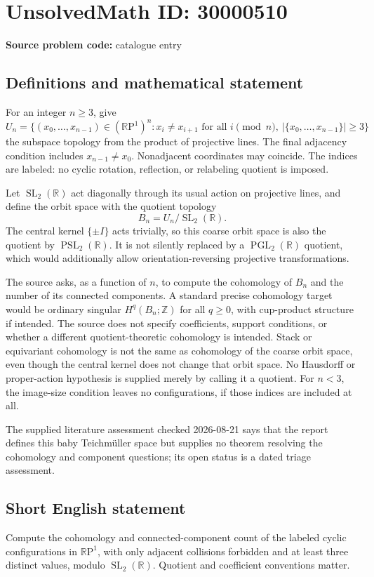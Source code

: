\documentclass[11pt]{article}
\newcommand{\Z}{\mathbb{Z}}
\newcommand{\R}{\mathbb{R}}
\begin{document}
\section*{UnsolvedMath ID: 30000510}
\textbf{Source problem code:} catalogue entry
\subsection{Definitions and mathematical statement}
For an integer \(n\geq3\), give
\[
U_n=\{(x_0,\ldots,x_{n-1})\in(\R\mathrm P^1)^n:
 x_i\ne x_{i+1}\text{ for all }i\pmod n,\ |\{x_0,\ldots,x_{n-1}\}|\geq3\}
\]
the subspace topology from the product of projective lines. The final adjacency condition includes \(x_{n-1}\ne x_0\). Nonadjacent coordinates may coincide. The indices are labeled: no cyclic rotation, reflection, or relabeling quotient is imposed.

Let \(\operatorname{SL}_2(\R)\) act diagonally through its usual action on projective lines, and define the orbit space with the quotient topology
\[
B_n=U_n/\operatorname{SL}_2(\R).
\]
The central kernel \(\{\pm I\}\) acts trivially, so this coarse orbit space is also the quotient by \(\operatorname{PSL}_2(\R)\). It is not silently replaced by a \(\operatorname{PGL}_2(\R)\) quotient, which would additionally allow orientation-reversing projective transformations.

The source asks, as a function of \(n\), to compute the cohomology of \(B_n\) and the number of its connected components. A standard precise cohomology target would be ordinary singular \(H^q(B_n;\Z)\) for all \(q\geq0\), with cup-product structure if intended. The source does not specify coefficients, support conditions, or whether a different quotient-theoretic cohomology is intended. Stack or equivariant cohomology is not the same as cohomology of the coarse orbit space, even though the central kernel does not change that orbit space. No Hausdorff or proper-action hypothesis is supplied merely by calling it a quotient. For \(n<3\), the image-size condition leaves no configurations, if those indices are included at all.

The supplied literature assessment checked 2026-08-21 says that the report defines this baby Teichm\"uller space but supplies no theorem resolving the cohomology and component questions; its open status is a dated triage assessment.
\subsection{Short English statement}
Compute the cohomology and connected-component count of the labeled cyclic configurations in \(\R\mathrm P^1\), with only adjacent collisions forbidden and at least three distinct values, modulo \(\operatorname{SL}_2(\R)\). Quotient and coefficient conventions matter.
\end{document}
